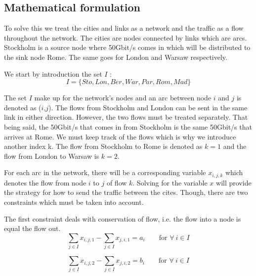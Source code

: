 \subsection{Mathematical formulation}
To solve this we treat the cities and links as a network and the traffic as a flow throughout the network. The cities are nodes connected by links which are arcs. Stockholm is a source node where 50Gbit/s comes in which will be distributed to the sink node Rome. The same goes for London and Warsaw respectively.

We start by introduction the set $I$ :
$$I = \{ Sto,Lon,Ber,War,Par,Rom,Mad\}$$

The set $I$ make up for the network's nodes and an arc between node $i$ and $j$ is denoted as ($i$,$j$). The flows from Stockholm and London can be sent in the same link in either direction. However, the two flows must be treated separately. That being said, the 50Gbit/s that comes in from Stockholm is the same 50Gbit/s that arrives at Rome. We must keep track of the flows which is why we introduce another index k. The flow from Stockholm to Rome is denoted as $k=1$ and the flow from London to Warsaw is $k=2$.

For each arc in the network, there will be a corresponding variable $x_{i,j,k}$ which denotes the flow from node $i$ to $j$ of flow $k$. Solving for the variable $x$ will provide the strategy for how to send the traffic between the cites. Though, there are two constraints which must be taken into account. 

The first constraint deals with conservation of flow, i.e. the flow into a node is equal the flow out.
$$\sum\limits_{j \in I} x_{i,j,1} - \sum\limits_{j \in I} x_{j,i,1} = a_{i} \qquad \text{for } \forall \: i \in I$$

$$\sum\limits_{j \in I} x_{i,j,2} - \sum\limits_{j \in I} x_{j,i,2} = b_{i} \qquad \text{for } \forall \: i \in I$$

